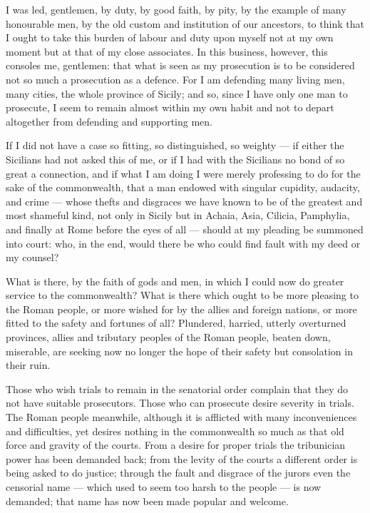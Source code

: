  I was led, gentlemen, by duty, by good faith, by pity, by the example of many honourable men, by the old custom and institution of our ancestors, to think that I ought to take this burden of labour and duty upon myself not at my own moment but at that of my close associates. In this business, however, this consoles me, gentlemen: that what is seen as my prosecution is to be considered not so much a prosecution as a defence. For I am defending many living men, many cities, the whole province of Sicily; and so, since I have only one man to prosecute, I seem to remain almost within my own habit and not to depart altogether from defending and supporting men.

 If I did not have a case so fitting, so distinguished, so weighty --- if either the Sicilians had not asked this of me, or if I had with the Sicilians no bond of so great a connection, and if what I am doing I were merely professing to do for the sake of the commonwealth, that a man endowed with singular cupidity, audacity, and crime --- whose thefts and disgraces we have known to be of the greatest and most shameful kind, not only in Sicily but in Achaia, Asia, Cilicia, Pamphylia, and finally at Rome before the eyes of all --- should at my pleading be summoned into court: who, in the end, would there be who could find fault with my deed or my counsel?

 What is there, by the faith of gods and men, in which I could now do greater service to the commonwealth? What is there which ought to be more pleasing to the Roman people, or more wished for by the allies and foreign nations, or more fitted to the safety and fortunes of all? Plundered, harried, utterly overturned provinces, allies and tributary peoples of the Roman people, beaten down, miserable, are seeking now no longer the hope of their safety but consolation in their ruin.

 Those who wish trials to remain in the senatorial order complain that they do not have suitable prosecutors. Those who can prosecute desire severity in trials. The Roman people meanwhile, although it is afflicted with many inconveniences and difficulties, yet desires nothing in the commonwealth so much as that old force and gravity of the courts. From a desire for proper trials the tribunician power has been demanded back; from the levity of the courts a different order is being asked to do justice; through the fault and disgrace of the jurors even the censorial name --- which used to seem too harsh to the people --- is now demanded; that name has now been made popular and welcome.

